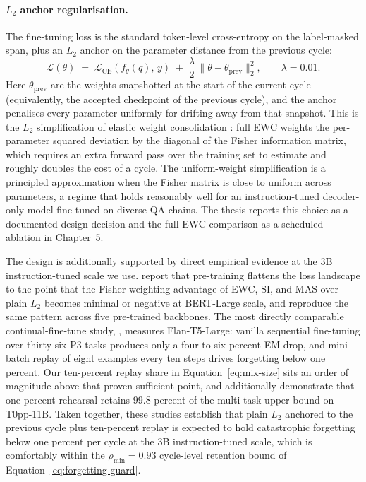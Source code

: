 \paragraph{$L_{2}$ anchor regularisation.}
The fine-tuning loss is the standard token-level cross-entropy on the label-masked span, plus an $L_{2}$ anchor on the parameter distance from the previous cycle:
\begin{equation}
\mathcal{L}(\theta) \;=\; \mathcal{L}_{\text{CE}}\!\left(f_{\theta}(q),\, y\right) \;+\; \frac{\lambda}{2} \,\lVert \theta - \theta_{\text{prev}} \rVert_{2}^{2}, \qquad \lambda = 0.01.
\label{eq:finetune-loss}
\end{equation}
Here $\theta_{\text{prev}}$ are the weights snapshotted at the start of the current cycle (equivalently, the accepted checkpoint of the previous cycle), and the anchor penalises every parameter uniformly for drifting away from that snapshot. This is the $L_{2}$ simplification of elastic weight consolidation \citep{doi:10.1073/pnas.1611835114}: full EWC weights the per-parameter squared deviation by the diagonal of the Fisher information matrix, which requires an extra forward pass over the training set to estimate and roughly doubles the cost of a cycle. The uniform-weight simplification is a principled approximation when the Fisher matrix is close to uniform across parameters, a regime that holds reasonably well for an instruction-tuned decoder-only model fine-tuned on diverse QA chains. The thesis reports this choice as a documented design decision and the full-EWC comparison as a scheduled ablation in Chapter~5.

The design is additionally supported by direct empirical evidence at
the 3B instruction-tuned scale we use. \citet{mehta2023empirical}
report that pre-training flattens the loss landscape to the point that
the Fisher-weighting advantage of EWC, SI, and MAS over plain
$L_{2}$ becomes minimal or negative at BERT-Large scale, and
\citet{wu2022pretrained} reproduce the same pattern across five
pre-trained backbones. The most directly comparable continual-fine-tune
study, \citet{jin2024forget}, measures Flan-T5-Large: vanilla sequential
fine-tuning over thirty-six P3 tasks produces only a four-to-six-percent
EM drop, and mini-batch replay of eight examples every ten steps drives
forgetting below one percent. Our ten-percent replay share in
Equation~\ref{eq:mix-size} sits an order of magnitude above that
proven-sufficient point, and \citet{scialom2022fine} additionally
demonstrate that one-percent rehearsal retains 99.8 percent of the
multi-task upper bound on T0pp-11B. Taken together, these studies
establish that plain $L_{2}$ anchored to the previous cycle plus
ten-percent replay is expected to hold catastrophic forgetting below
one percent per cycle at the 3B instruction-tuned scale, which is
comfortably within the $\rho_{\min} = 0.93$ cycle-level retention bound
of Equation~\ref{eq:forgetting-guard}.

